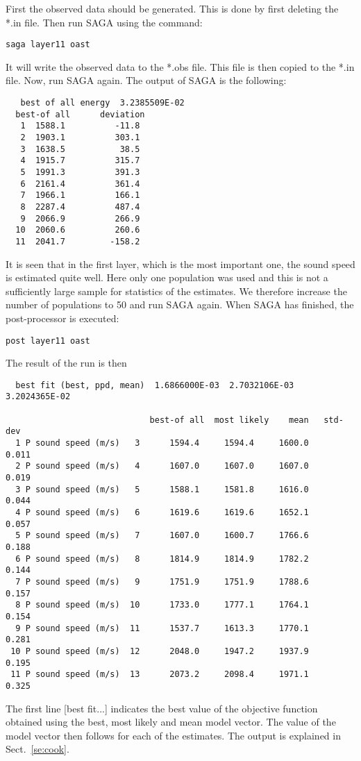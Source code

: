 \documentclass{saclantc}
\begin{document}
First the observed data should be generated. This is done by first
deleting the *.in file. Then run {\sf SAGA} using the command:

{\tt saga layer11 oast}

It will write the observed data
to the *.obs file. This file is then copied to the *.in file.
Now, run {\sf SAGA} again. The output of {\sf SAGA} is the following:

\small
\begin{verbatim}
   best of all energy  3.2385509E-02
  best-of all      deviation  
   1  1588.1          -11.8
   2  1903.1          303.1
   3  1638.5           38.5
   4  1915.7          315.7
   5  1991.3          391.3
   6  2161.4          361.4
   7  1966.1          166.1
   8  2287.4          487.4
   9  2066.9          266.9
  10  2060.6          260.6
  11  2041.7         -158.2
 \end{verbatim}
\normalsize

It is seen that in the first layer, which is the most important one,
the sound speed is estimated quite well. Here only one
population was used and this  is not  a sufficiently large sample for  statistics of the
estimates. We therefore increase the number of populations to 
50 and run {\sf SAGA} again.
When {\sf SAGA} has finished, the post-processor is executed:

{\tt post layer11 oast} 

The result of the run is then
\small
\begin{verbatim}
  best fit (best, ppd, mean)  1.6866000E-03  2.7032106E-03  3.2024365E-02

                             best-of all  most likely    mean   std-dev
  1 P sound speed (m/s)   3      1594.4     1594.4     1600.0     0.011
  2 P sound speed (m/s)   4      1607.0     1607.0     1607.0     0.019
  3 P sound speed (m/s)   5      1588.1     1581.8     1616.0     0.044
  4 P sound speed (m/s)   6      1619.6     1619.6     1652.1     0.057
  5 P sound speed (m/s)   7      1607.0     1600.7     1766.6     0.188
  6 P sound speed (m/s)   8      1814.9     1814.9     1782.2     0.144
  7 P sound speed (m/s)   9      1751.9     1751.9     1788.6     0.157
  8 P sound speed (m/s)  10      1733.0     1777.1     1764.1     0.154
  9 P sound speed (m/s)  11      1537.7     1613.3     1770.1     0.281
 10 P sound speed (m/s)  12      2048.0     1947.2     1937.9     0.195
 11 P sound speed (m/s)  13      2073.2     2098.4     1971.1     0.325
\end{verbatim}
\normalsize
The first line [best fit...]
 indicates the best value of the objective function 
 obtained using the best, most likely and mean model vector. The
value of the model vector then follows for each of the estimates. The
output is explained in Sect.\ \ref{se:cook}.
\end{document}
